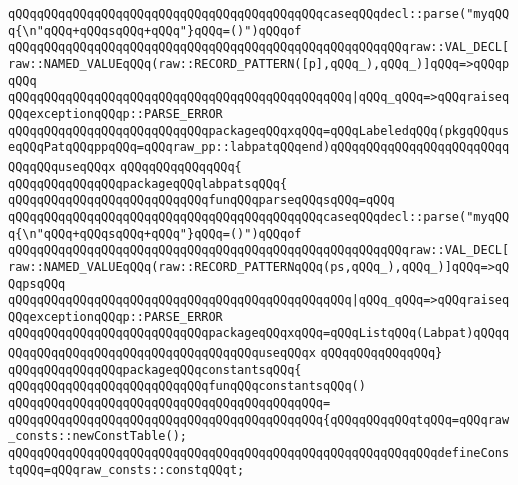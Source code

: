 \verb|qQQqqQQqqQQqqQQqqQQqqQQqqQQqqQQqqQQqqQQqqQQqcaseqQQqdecl::parse("myqQQq{\n"qQQq+qQQqsqQQq+qQQq"}qQQq=()")qQQqof|\newline
\verb|qQQqqQQqqQQqqQQqqQQqqQQqqQQqqQQqqQQqqQQqqQQqqQQqqQQqqQQqraw::VAL_DECL[raw::NAMED_VALUEqQQq(raw::RECORD_PATTERN([p],qQQq_),qQQq_)]qQQq=>qQQqpqQQq|\newline
\verb|qQQqqQQqqQQqqQQqqQQqqQQqqQQqqQQqqQQqqQQqqQQqqQQq|\verb#|qQQq_qQQq=>qQQqraiseqQQqexceptionqQQqp::PARSE_ERROR#\newline
\verb|qQQqqQQqqQQqqQQqqQQqqQQqqQQqpackageqQQqxqQQq=qQQqLabeledqQQq(pkgqQQquseqQQqPatqQQqppqQQq=qQQqraw_pp::labpatqQQqend)qQQqqQQqqQQqqQQqqQQqqQQqqQQqqQQquseqQQqx|\newline
\verb|qQQqqQQqqQQqqQQq{|\newline
\newline
\verb|qQQqqQQqqQQqqQQqpackageqQQqlabpatsqQQq{|\newline
\newline
\verb|qQQqqQQqqQQqqQQqqQQqqQQqqQQqfunqQQqparseqQQqsqQQq=qQQq|\newline
\verb|qQQqqQQqqQQqqQQqqQQqqQQqqQQqqQQqqQQqqQQqqQQqcaseqQQqdecl::parse("myqQQq{\n"qQQq+qQQqsqQQq+qQQq"}qQQq=()")qQQqof|\newline
\verb|qQQqqQQqqQQqqQQqqQQqqQQqqQQqqQQqqQQqqQQqqQQqqQQqqQQqqQQqraw::VAL_DECL[raw::NAMED_VALUEqQQq(raw::RECORD_PATTERNqQQq(ps,qQQq_),qQQq_)]qQQq=>qQQqpsqQQq|\newline
\verb|qQQqqQQqqQQqqQQqqQQqqQQqqQQqqQQqqQQqqQQqqQQqqQQq|\verb#|qQQq_qQQq=>qQQqraiseqQQqexceptionqQQqp::PARSE_ERROR#\newline
\verb|qQQqqQQqqQQqqQQqqQQqqQQqqQQqpackageqQQqxqQQq=qQQqListqQQq(Labpat)qQQqqQQqqQQqqQQqqQQqqQQqqQQqqQQqqQQqqQQquseqQQqx|\newline
\verb|qQQqqQQqqQQqqQQq}|\newline
\newline
\verb|qQQqqQQqqQQqqQQqpackageqQQqconstantsqQQq{|\newline
\newline
\verb|qQQqqQQqqQQqqQQqqQQqqQQqqQQqfunqQQqconstantsqQQq()|\newline
\verb|qQQqqQQqqQQqqQQqqQQqqQQqqQQqqQQqqQQqqQQqqQQq=|\newline
\verb|qQQqqQQqqQQqqQQqqQQqqQQqqQQqqQQqqQQqqQQqqQQq{qQQqqQQqqQQqtqQQq=qQQqraw_consts::newConstTable();|\newline
\verb|qQQqqQQqqQQqqQQqqQQqqQQqqQQqqQQqqQQqqQQqqQQqqQQqqQQqqQQqqQQqdefineConstqQQq=qQQqraw_consts::constqQQqt;|\newline
